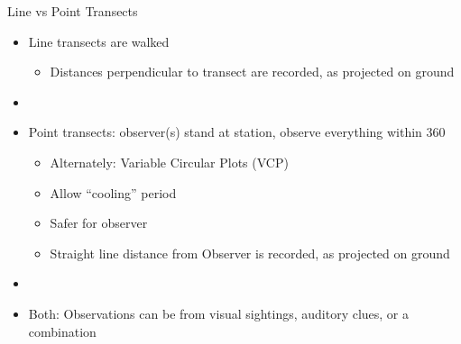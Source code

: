 \documentclass{beamer}
\begin{document}
\begin{frame}{Line vs Point Transects}
	\begin{itemize}
	\item Line transects are walked
	\begin{itemize}
		\item Distances perpendicular to transect are recorded, as projected on ground
	\end{itemize}
	\item[]
	\item Point transects: observer(s) stand at station, observe everything within 360\textdegree 
		\begin{itemize}
		\item Alternately: Variable Circular Plots (VCP)
		\item Allow ``cooling'' period
		\item Safer for observer
		\item Straight line distance from Observer is recorded, as projected on ground
		\end{itemize}
	\item[]		
	\item Both: Observations can be from visual sightings, auditory clues, or a combination
	\end{itemize}
\end{frame}
\end{document}
